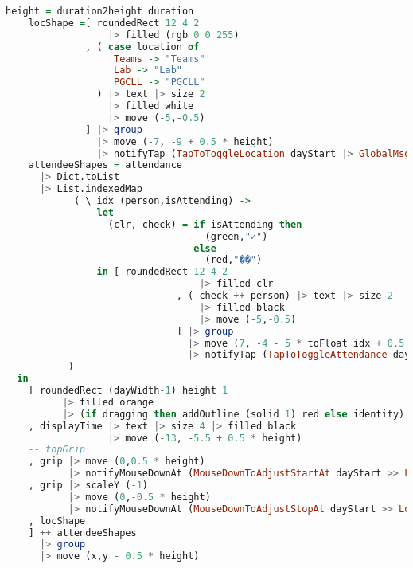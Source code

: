 \begin{lstlisting}[language=Haskell, caption=Defining a Event component in TEASync Calendar Application, label=lst:java]
    height = duration2height duration 
    locShape =[ roundedRect 12 4 2
                  |> filled (rgb 0 0 255)
              , ( case location of
                   Teams -> "Teams"
                   Lab -> "Lab"
                   PGCLL -> "PGCLL"
                ) |> text |> size 2
                  |> filled white
                  |> move (-5,-0.5)
              ] |> group
                |> move (-7, -9 + 0.5 * height)
                |> notifyTap (TapToToggleLocation dayStart |> GlobalMsg)
    attendeeShapes = attendance
      |> Dict.toList
      |> List.indexedMap 
            ( \ idx (person,isAttending) -> 
                let
                  (clr, check) = if isAttending then
                                   (green,"✓")
                                 else
                                   (red,"��")
                in [ roundedRect 12 4 2
                                  |> filled clr
                              , ( check ++ person) |> text |> size 2
                                  |> filled black
                                  |> move (-5,-0.5)
                              ] |> group
                                |> move (7, -4 - 5 * toFloat idx + 0.5 * height)
                                |> notifyTap (TapToToggleAttendance dayStart person |> GlobalMsg)
           )
  in
    [ roundedRect (dayWidth-1) height 1
          |> filled orange
          |> (if dragging then addOutline (solid 1) red else identity)
    , displayTime |> text |> size 4 |> filled black
                  |> move (-13, -5.5 + 0.5 * height)
    -- topGrip
    , grip |> move (0,0.5 * height)
           |> notifyMouseDownAt (MouseDownToAdjustStartAt dayStart >> LocalMsg)
    , grip |> scaleY (-1)
           |> move (0,-0.5 * height)
           |> notifyMouseDownAt (MouseDownToAdjustStopAt dayStart >> LocalMsg)
    , locShape 
    ] ++ attendeeShapes
      |> group
      |> move (x,y - 0.5 * height)
\end{lstlisting}

